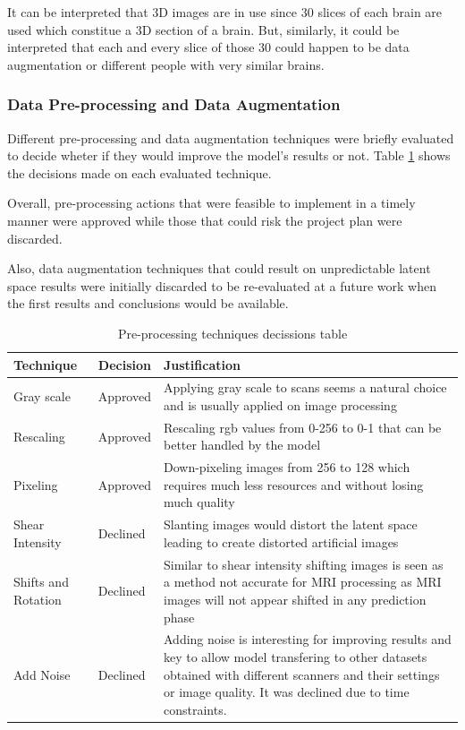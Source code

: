 It can be interpreted that 3D images are in use since 30 slices of each brain are used which constitue a 3D section of a brain. But, similarly, it could be interpreted that each and every slice of those 30 could happen to be data augmentation or different people with very similar brains.

\subsubsection*{Data Pre-processing and Data Augmentation}

Different pre-processing and data augmentation techniques were briefly evaluated to decide wheter if they would improve the model's results or not. Table \ref{table:preprocessing} shows the decisions made on each evaluated technique.

Overall, pre-processing actions that were feasible to implement in a timely manner were approved while those that could risk the project plan were discarded.

Also, data augmentation techniques that could result on unpredictable latent space results were initially discarded to be re-evaluated at a future work when the first results and conclusions would be available.

\begin{table}
    \centering
    \begin{tabular}{p{3cm}|p{2cm}|p{6cm}}
        \hline
        Technique & Decision & Justification \\
        \hline
        Gray scale & Approved & Applying gray scale to scans seems a natural choice and is usually applied on image processing \\
        Rescaling & Approved & Rescaling \acrshort{rgb} values from 0-256 to 0-1 that can be better handled by the model  \\
        Pixeling & Approved & Down-pixeling images from 256 to 128 which requires much less resources and without losing much quality \\
        Shear Intensity & Declined & Slanting images would distort the latent space leading to create distorted artificial images \\
        Shifts and Rotation & Declined & Similar to shear intensity shifting images is seen as a method not accurate for MRI processing as MRI images will not appear shifted in any prediction phase \\
        Add Noise & Declined & Adding noise is interesting for improving results and key to allow model transfering to other datasets obtained with different scanners and their settings or image quality. It was declined due to time constraints. \\
        \hline
    \end{tabular}
    \caption{Pre-processing techniques decissions table}
    \label{table:preprocessing}
\end{table}

